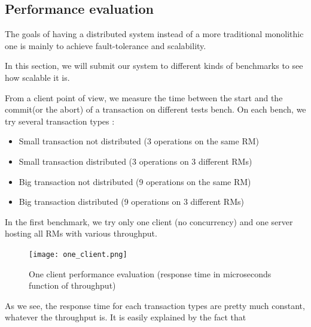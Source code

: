\documentclass[a4paper]{article}
\begin{document}
\subsection{Performance evaluation}
The goals of having a distributed system instead of a more traditional monolithic one is mainly to achieve fault-tolerance and scalability.

In this section, we will submit our system to different kinds of benchmarks to see how scalable it is.

From a client point of view, we measure the time between the start and the commit(or the abort) of a transaction on different tests bench.
On each bench, we try several transaction types :
\begin{itemize}
\item Small transaction not distributed (3 operations on the same RM)
\item Small transaction distributed (3 operations on 3 different RMs)
\item Big transaction not distributed (9 operations on the same RM)
\item Big transaction distributed (9 operations on 3 different RMs)
\end{itemize}

In the first benchmark, we try only one client (no concurrency) and one server hosting all RMs with various throughput.
\begin{figure}[h!]
  \centering
	\texttt{[image: one\_client.png]}
  \caption{One client performance evaluation (response time in microseconds function of throughput)}
  \label{oneclient}
\end{figure}

As we see, the response time for each transaction types are pretty much constant, whatever the throughput is. It is easily explained by the fact that  
%
%
\end{document}
